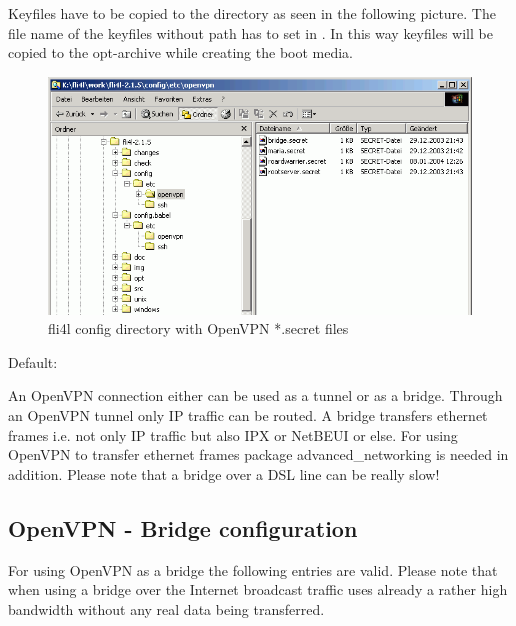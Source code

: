 \begin{description}
  Keyfiles have to be copied to the directory  
  as seen in the following picture. The file name of the keyfiles without 
  path has to set in . In this way keyfiles will 
  be copied to the opt-archive while creating the boot media.

  \begin{figure}[htbp]
    \centering
    \includegraphics[width=\columnwidth]{config_etc_openvpn}
    \caption{fli4l config directory with OpenVPN *.secret files}
    \label{fig:config_etc_openvpn}
  \end{figure}


  Default: 

  An OpenVPN connection either can be used as a tunnel or as a bridge. 
  Through an OpenVPN tunnel only IP traffic can be routed. A bridge 
  transfers ethernet frames i.e. not only IP traffic but also IPX or 
  NetBEUI or else. For using OpenVPN to transfer ethernet frames package 
  advanced\_networking is needed in addition. Please note that a bridge 
  over a DSL line can be really slow!

\end{description}

\subsection{OpenVPN - Bridge configuration}

  For using OpenVPN as a bridge the following entries are valid. Please 
  note that when using a bridge over the Internet broadcast traffic 
  uses already a rather high bandwidth without any real data being transferred.

